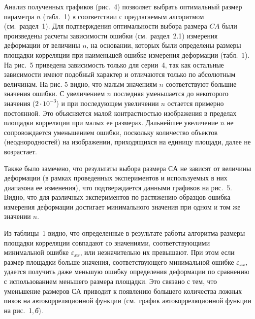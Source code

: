 \documentclass[a4paper]{jctart10}
\begin{document}
Анализ полученных графиков (рис.~4) позволяет выбрать оптимальный размер параметра $n$ (табл.~1) в соответствии с предлагаемым алгоритмом (см.~раздел~1). Для подтверждения оптимальности выбора размера $CA$ были произведены расчеты зависимости ошибки (см.~раздел~2.1) измерения деформации от величины $n$, на основании, которых были определены размеры площадки корреляции при наименьшей ошибке измерения деформации (табл.~1). На рис.~5 приведена зависимость только для серии~4, так как остальные зависимости имеют подобный характер и отличаются только по абсолютным величинам. На рис. 5 видно, что малым значениям $n$ соответствуют большие значения ошибки. С увеличением $n$ последняя уменьшается до некоторого значения ($2 \cdot 10^{-3}$) и при последующем увеличении $n$ остается примерно постоянной. Это объясняется малой контрастностью изображения в пределах площадки корреляции при малых ее размерах. Дальнейшее увеличение $n$ не сопровождается уменьшением ошибки, поскольку количество объектов (неоднородностей) на изображении, приходящихся на единицу площади, далее не возрастает.

Также было замечено, что результаты выбора размера $СА$ не зависят от величины деформации (в рамках проведенных экспериментов и используемых в них диапазона ее изменения), что подтверждается данными графиков на рис.~5. Видно, что для различных экспериментов по растяжению образцов ошибка измерения деформации достигает минимального значения при одном и том же значении $n$.

Из таблицы~1 видно, что определенные в результате работы алгоритма размеры площадки корреляции совпадают со значениями, соответствующими минимальной ошибке $\varepsilon_{xx}$, или незначительно их превышают. При этом если размер площадки больше значения, соответствующего минимальной ошибке $\varepsilon_{xx}$, удается получить даже меньшую ошибку определения деформации по сравнению с использованием меньшего размера площадки. Это связано с тем, что уменьшение размеров $СА$ приводит к появлению большего количества ложных пиков на автокорреляционной функции (см.~график автокорреляционной функции на рис.~1,\,{\it б}).
\end{document}
